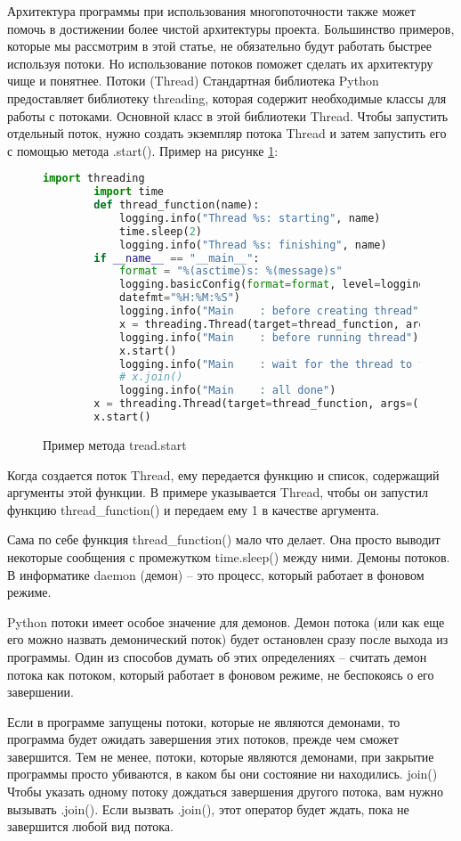 Архитектура программы при использования многопоточности также может помочь в достижении более чистой архитектуры проекта. Большинство примеров, которые мы рассмотрим в этой статье, не обязательно будут работать быстрее используя потоки. Но использование потоков поможет сделать их архитектуру чище и понятнее.
Потоки (Thread)
Стандартная библиотека Python предоставляет библиотеку threading, которая содержит необходимые классы для работы с потоками. Основной класс в этой библиотеки Thread. Чтобы запустить отдельный поток, нужно создать экземпляр потока Thread и затем запустить его с помощью метода .start(). Пример на рисунке \ref{treading:image}:
\begin{figure}[H]
	\begin{lstlisting}[language=Python]
		import threading
		import time
		def thread_function(name):
			logging.info("Thread %s: starting", name)
			time.sleep(2)
			logging.info("Thread %s: finishing", name)
		if __name__ == "__main__":
			format = "%(asctime)s: %(message)s"
			logging.basicConfig(format=format, level=logging.INFO,
			datefmt="%H:%M:%S")
			logging.info("Main    : before creating thread")
			x = threading.Thread(target=thread_function, args=(1,))
			logging.info("Main    : before running thread")
			x.start()
			logging.info("Main    : wait for the thread to finish")
			# x.join()
			logging.info("Main    : all done")
		x = threading.Thread(target=thread_function, args=(1,))
		x.start()
	\end{lstlisting}  
	\caption{Пример метода tread.start}
	\label{treading:image}
\end{figure}
Когда создается поток Thread, ему передается функцию и список, содержащий аргументы этой функции. В примере указывается Thread, чтобы он запустил функцию thread\_function() и передаем ему 1 в качестве аргумента.

Сама по себе функция thread\_function() мало что делает. Она просто выводит некоторые сообщения с промежутком time.sleep() между ними.
Демоны потоков.
В информатике daemon (демон) – это процесс, который работает в фоновом режиме.

Python потоки имеет особое значение для демонов. Демон потока (или как еще его можно назвать демонический поток) будет остановлен сразу после выхода из программы. Один из способов думать об этих определениях – считать демон потока как потоком, который работает в фоновом режиме, не беспокоясь о его завершении.

Если в программе запущены потоки, которые не являются демонами, то программа будет ожидать завершения этих потоков, прежде чем сможет завершится. Тем не менее, потоки, которые являются демонами, при закрытие программы просто убиваются, в каком бы они состояние ни находились.
join()
Чтобы указать одному потоку дождаться завершения другого потока, вам нужно вызывать .join().  Если вызвать .join(), этот оператор будет ждать, пока не завершится любой вид потока.

